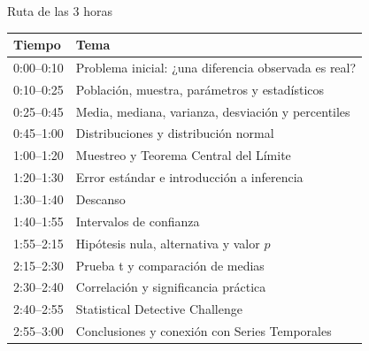 \documentclass[aspectratio=169,11pt]{beamer}
\begin{document}
\begin{frame}{Ruta de las 3 horas}

\scriptsize

\begin{table}
\centering

\begin{tabular}{p{2.2cm}p{8.7cm}}
\toprule

\textbf{Tiempo} &
\textbf{Tema} \\

\midrule

0:00--0:10 &
Problema inicial: ¿una diferencia observada es real? \\

0:10--0:25 &
Población, muestra, parámetros y estadísticos \\

0:25--0:45 &
Media, mediana, varianza, desviación y percentiles \\

0:45--1:00 &
Distribuciones y distribución normal \\

1:00--1:20 &
Muestreo y Teorema Central del Límite \\

1:20--1:30 &
Error estándar e introducción a inferencia \\

1:30--1:40 &
Descanso \\

1:40--1:55 &
Intervalos de confianza \\

1:55--2:15 &
Hipótesis nula, alternativa y valor $p$ \\

2:15--2:30 &
Prueba t y comparación de medias \\

2:30--2:40 &
Correlación y significancia práctica \\

2:40--2:55 &
Statistical Detective Challenge \\

2:55--3:00 &
Conclusiones y conexión con Series Temporales \\

\bottomrule

\end{tabular}

\end{table}

\end{frame}
\end{document}
